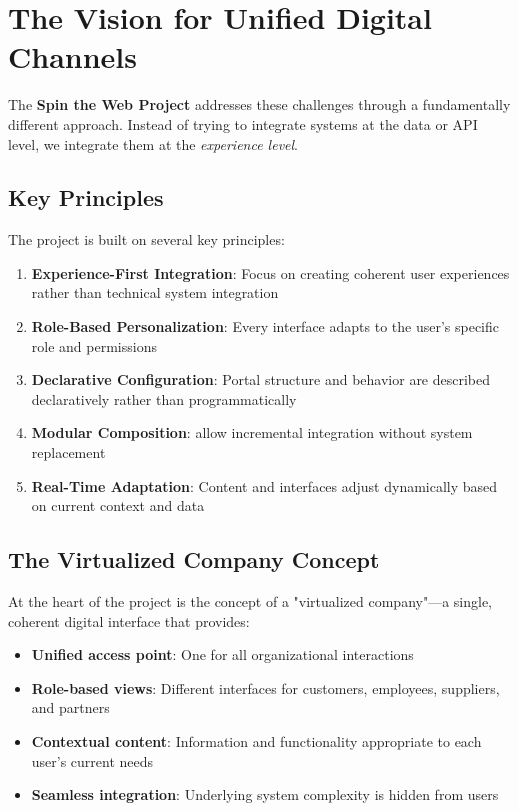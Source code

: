 \section{The Vision for Unified Digital Channels}
\label{sec:unified-vision}

The \textbf{Spin the Web Project} addresses these challenges through a fundamentally different approach. Instead of trying to integrate systems at the data or API level, we integrate them at the \textit{experience level}.

\subsection{Key Principles}
The project is built on several key principles:

\begin{enumerate}
\item \textbf{Experience-First Integration}: Focus on creating coherent user experiences rather than technical system integration
\item \textbf{Role-Based Personalization}: Every interface adapts to the user's specific role and permissions
\item \textbf{Declarative Configuration}: Portal structure and behavior are described declaratively rather than programmatically
\item \textbf{Modular Composition}:  allow incremental integration without system replacement
\item \textbf{Real-Time Adaptation}: Content and interfaces adjust dynamically based on current context and data
\end{enumerate}

\subsection{The Virtualized Company Concept}
At the heart of the project is the concept of a "virtualized company"—a single, coherent digital interface that provides:
\begin{itemize}
\item \textbf{Unified access point}: One \url{} for all organizational interactions
\item \textbf{Role-based views}: Different interfaces for customers, employees, suppliers, and partners
\item \textbf{Contextual content}: Information and functionality appropriate to each user's current needs
\item \textbf{Seamless integration}: Underlying system complexity is hidden from users
\end{itemize}

